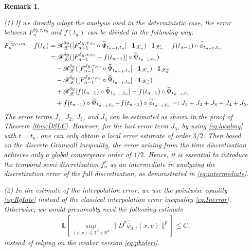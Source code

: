 \documentclass[11pt,reqno]{amsproc}
\newtheorem{remark}[Def]{Remark}
\newcommand{\R}{\mathbb{R}}
\numberwithin{equation}{section}
\newcommand{\E}{\mathbb{E}}\allowdisplaybreaks[4]
\begin{document}
\begin{remark}\label{rem:secconvergence}

(1) If we directly adopt the analysis used in the deterministic case, the error between $F_n^{\delta y,\tau,\epsilon_0}$ and $f(t_n)$ can be divided in the
following way:
\begin{align*}
F_n^{\delta y,\tau,\epsilon_0}-f(t_n)
&=\mathscr{R}_{\mathscr{X}}^{\delta y}([F^{\delta y,\tau,\epsilon_0}_{n-1}\circ\widehat{\Psi}_{t_{n-1},t_{n}}]\cdot\mathbf{1}_{\mathscr{X}_n})\cdot\mathbf{1}_{\mathscr{X}_n}-f(t_{n-1})\circ\widehat{\phi}_{t_{n-1},t_n}\\\notag
	&=\mathscr{R}_{\mathscr{X}}^{\delta y}([F_{n-1}^{\delta y,\tau,\epsilon_0}-f(t_{n-1})]\circ\widehat{\Psi}_{t_{n-1},t_n})\\
	&\quad-\mathscr{R}_{\mathscr{X}}^{\delta y}([F^{\delta y,\tau,\epsilon_0}_{n-1}\circ\widehat{\Psi}_{t_{n-1},t_{n}}]\cdot\mathbf{1}_{\mathscr{X}_n})\cdot\mathbf{1}_{\mathscr{X}_n^c}\\\notag
	&\quad-\mathscr{R}_{\mathscr{X}}^{\delta y}([F^{\delta y,\tau,\epsilon_0}_{n-1}\circ\widehat{\Psi}_{t_{n-1},t_{n}}]\cdot\mathbf{1}_{\mathscr{X}_n^c})\\
	&\quad+\mathscr{R}_{\mathscr{X}}^{\delta y}[f(t_{n-1})\circ\widehat{\Psi}_{t_{n-1},t_n}]-f(t_{n-1})\circ\widehat{\Psi}_{t_{n-1},t_n}\\
	&\quad+f(t_{n-1})\circ\widehat{\Psi}_{t_{n-1},t_n}\!-\!f(t_{n-1})\circ\widehat{\phi}_{t_{n-1},t_n}=:J_1+J_2+J_3+J_4+J_5.	
\end{align*}
The error terms $J_1$, $J_2$, $J_3$, and $J_4$ can be estimated as shown in the proof of Theorem \ref{thm:DSLC}.  However, for the last error term $J_5$, by using \eqref{eq:localmq} with $t=t_n$, one can only obtain a local error estimate of order $3/2$. Then based on the discrete Gronwall inequality, the error arising from the time discretization achieves only a global convergence order of  $1/2$.
Hence, it is essential to introduce the temporal semi-discretization $f_n^\tau$ as an intermediate in analyzing the discretization error of the full discretization, as demonstrated  in \eqref{eq:intermediate}. 


(2) In the estimate of the interpolation error, we use the pointwise equality \eqref{eq:RgInte} instead of the classical interpolation error inequality \eqref{eq:Inerror}. Otherwise, we would presumably need the following estimate
\begin{align*}
\E\left[\sup_{(x,v)\in\mathbb{T}^d\times\R^d}\|D^2\widehat{\phi}_{0,t}(x,v)\|^p\right]\le C,
\end{align*}
instead of relying on the weaker version \eqref{eq:phideri}. 
\end{remark}
\end{document}
